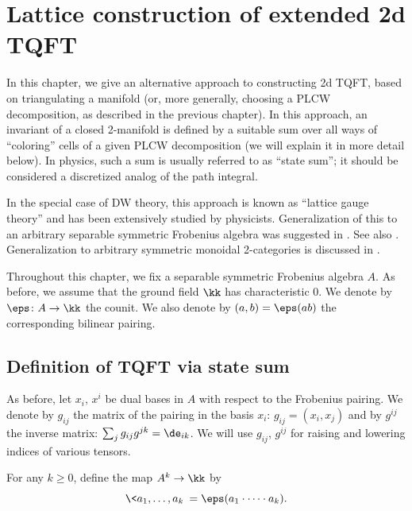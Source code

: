 \chapter{Lattice construction of extended 2d TQFT}\label{c:2d-lattice}

In this chapter, we give an alternative approach to constructing 2d TQFT, based
on triangulating a manifold (or, more generally, choosing a PLCW decomposition,
as described in the previous chapter). In this approach, an invariant of a
closed 2-manifold is defined by a suitable sum over all ways of ``coloring''
cells of a given PLCW decomposition (we will explain it in more detail below).
In physics, such a sum is usually referred to as ``state sum''; it should be
considered a discretized analog of the path integral.

In the special case of DW theory, this approach is known as ``lattice gauge
theory'' and has been extensively studied by physicists. Generalization of
this to an arbitrary separable symmetric Frobenius algebra was suggested in
\cite{fhk}. See also \cite{oeckl}. Generalization to arbitrary symmetric
monoidal 2-categories is discussed in \cite{davidovich}.

Throughout this chapter, we fix a separable symmetric Frobenius algebra
$A$. As before, we assume that the ground field $\kk$ has characteristic 0.
We denote by $\eps \colon A\to \kk$ the counit. We also denote by
$(a,b)=\eps(ab)$ the corresponding bilinear pairing.

\section{Definition of TQFT via state sum}\label{s:state-sum}
As before, let $x_i$, $x^i$ be dual bases in $A$ with respect to the
Frobenius pairing. We denote by $g_{ij}$ the matrix of the pairing in
the basis $x_i$: $g_{ij}=(x_i,x_j)$ and by $g^{ij}$ the inverse matrix:
$\sum_{j} g_{ij}g^{jk}=\de_{ik}$. We will use $g_{ij}$, $g^{ij}$ for
raising and lowering indices of various tensors.

For any $k \ge 0$, define the map $A^k\to \kk$ by
\begin{equation}\label{e:k-pairing}
\< a_1, \dots, a_k\> = \eps (a_1\cdot \dots \cdot a_k).
\end{equation}

